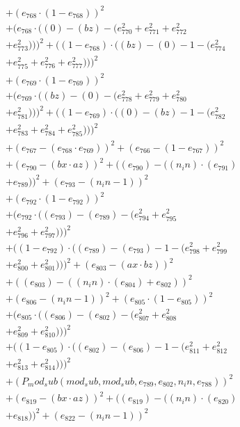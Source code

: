 \documentclass[10pt, a4paper]{article}
\begin{document}
\begin{small}
\begin{align*}
& + (e_{768}  \cdot  (1 - e_{768}))^{2} \\
& + (e_{768}  \cdot  ((0) - (bz) - (e_{770}^{2} + e_{771}^{2} + e_{772}^{2} \\
& + e_{773}^{2})))^{2} + ((1 - e_{768})  \cdot  ((bz) - (0) - 1 - (e_{774}^{2} \\
& + e_{775}^{2} + e_{776}^{2} + e_{777}^{2})))^{2} \\
& + (e_{769}  \cdot  (1 - e_{769}))^{2} \\
& + (e_{769}  \cdot  ((bz) - (0) - (e_{778}^{2} + e_{779}^{2} + e_{780}^{2} \\
& + e_{781}^{2})))^{2} + ((1 - e_{769})  \cdot  ((0) - (bz) - 1 - (e_{782}^{2} \\
& + e_{783}^{2} + e_{784}^{2} + e_{785}^{2})))^{2} \\
& + (e_{767} - (e_{768}  \cdot  e_{769}))^{2} + (e_{766} - (1 - e_{767}))^{2} \\
& + (e_{790} - (bx  \cdot  az))^{2} + ((e_{790}) - ((n_in)  \cdot  (e_{791}) \\
& + e_{789}))^{2} + (e_{793} - (n_in - 1))^{2} \\
& + (e_{792}  \cdot  (1 - e_{792}))^{2} \\
& + (e_{792}  \cdot  ((e_{793}) - (e_{789}) - (e_{794}^{2} + e_{795}^{2} \\
& + e_{796}^{2} + e_{797}^{2})))^{2} \\
& + ((1 - e_{792})  \cdot  ((e_{789}) - (e_{793}) - 1 - (e_{798}^{2} + e_{799}^{2} \\
& + e_{800}^{2} + e_{801}^{2})))^{2} + (e_{803} - (ax  \cdot  bz))^{2} \\
& + ((e_{803}) - ((n_in)  \cdot  (e_{804}) + e_{802}))^{2} \\
& + (e_{806} - (n_in - 1))^{2} + (e_{805}  \cdot  (1 - e_{805}))^{2} \\
& + (e_{805}  \cdot  ((e_{806}) - (e_{802}) - (e_{807}^{2} + e_{808}^{2} \\
& + e_{809}^{2} + e_{810}^{2})))^{2} \\
& + ((1 - e_{805})  \cdot  ((e_{802}) - (e_{806}) - 1 - (e_{811}^{2} + e_{812}^{2} \\
& + e_{813}^{2} + e_{814}^{2})))^{2} \\
& + (P_mod_sub(mod_sub, mod_sub, e_{789}, e_{802}, n_in, e_{788}))^{2} \\
& + (e_{819} - (bx  \cdot  az))^{2} + ((e_{819}) - ((n_in)  \cdot  (e_{820}) \\
& + e_{818}))^{2} + (e_{822} - (n_in - 1))^{2} \\

\end{align*}
\end{small}
\end{document}
